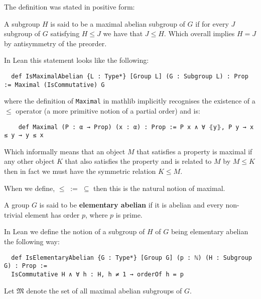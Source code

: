 \begin{remark}
The definition was stated in positive form:

A subgroup $H$ is said to be a maximal abelian subgroup of $G$ if for every $J$ subgroup of $G$ satisfying $H \le J$ we have that $J \le H$. Which overall implies $H = J$ by antisymmetry of the preorder.

In Lean this statement looks like the following:

\begin{verbatim}
  def IsMaximalAbelian {L : Type*} [Group L] (G : Subgroup L) : Prop := Maximal (IsCommutative) G
\end{verbatim}

  where the definition of \texttt{Maximal} in mathlib implicitly recognises the existence of a $\le$ operator (a more primitive notion of a partial order) and is:

  \begin{verbatim}
    def Maximal (P : α → Prop) (x : α) : Prop := P x ∧ ∀ ⦃y⦄, P y → x ≤ y → y ≤ x
  \end{verbatim}

  Which informally means that an object $M$ that satisfies a property is maximal if any other object $K$ that also satisfies the property and is related to $M$ by $M \le K$ then in fact we must have the symmetric relation $K \le M$.

  When we define, $\le \; := \;  \subseteq$ then this is the natural notion of maximal.
\end{remark}


\begin{definition}
\label{IsElementaryAbelian}
\leanok
A group $G$ is said to be \textbf{elementary abelian} if it is abelian and every non-trivial element has order $p$, where $p$ is prime.
\end{definition}

\begin{remark}
  In Lean we define the notion of a subgroup of $H$ of $G$ being elementary abelian the following way:
  
  \begin{verbatim}
  def IsElementaryAbelian {G : Type*} [Group G] (p : ℕ) (H : Subgroup G) : Prop :=
  IsCommutative H ∧ ∀ h : H, h ≠ 1 → orderOf h = p
  \end{verbatim}
\end{remark}

\begin{definition}
\label{MaximalAbelianSubgroupsOf}
\leanok
Let $\mathfrak{M}$ denote the set of all maximal abelian subgroups of $G$.
\end{definition}

